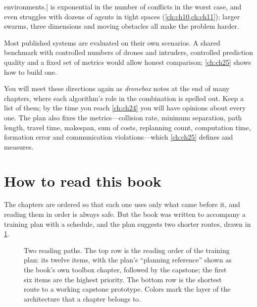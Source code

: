 \begin{description}[style=nextline,leftmargin=1.5em]
    environments.] \cbs is exponential in the number of conflicts in the worst case,
    and even \ecbs struggles with dozens of agents in tight spaces
    (\cref{ch:ch10,ch:ch11}); larger swarms, three dimensions and moving obstacles all
    make the problem harder.
  \item[Benchmarks that compare local-only, replan-only and hybrid approaches under
    the same conditions.] Most published systems are evaluated on their own
    scenarios. A shared benchmark with controlled numbers of drones and intruders,
    controlled prediction quality and a fixed set of metrics would allow honest
    comparison; \cref{ch:ch25} shows how to build one.
\end{description}

You will meet these directions again as \emph{dronebox} notes at the end of many
chapters, where each algorithm's role in the combination is spelled out. Keep a list
of them; by the time you reach \cref{ch:ch24} you will have opinions about every one.
The plan also fixes the metrics---collision rate, minimum separation, path length,
travel time, makespan, sum of costs, replanning count, computation time, formation
error and communication violations---which \cref{ch:ch25} defines and measures.

\section{How to read this book}
\label{sec:ch01-howto}

The chapters are ordered so that each one uses only what came before it, and reading
them in order is always safe. But the book was written to accompany a training plan
with a schedule, and the plan suggests two shorter routes, drawn in
\cref{fig:ch01-reading-paths}.

\begin{figure}[tb]
  \centering
  \caption{Two reading paths. The top row is the reading order of the training plan:
    its twelve items, with the plan's ``planning reference'' shown as the book's own
    toolbox chapter, followed by the capstone; the first six items are the highest
    priority. The bottom row is the shortest route to a working capstone prototype.
    Colors mark the layer of the architecture that a chapter belongs to.}
  \label{fig:ch01-reading-paths}
\end{figure}

